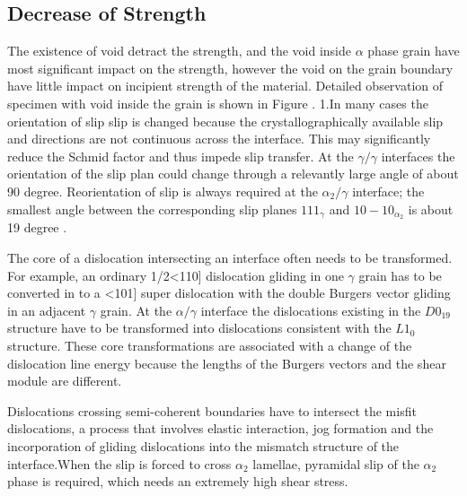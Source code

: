 \documentclass[final,5p,times,onecolumn]{elsarticle}
\begin{document}
\subsection{Decrease of Strength}

The existence of void detract the strength, and the void inside $\alpha$ phase grain have most significant  impact on the strength, however the void on the grain boundary have little impact on incipient strength of the material. Detailed observation of specimen with void inside the grain is shown in Figure \cite{}.
1.In many cases the orientation of slip slip is changed because the crystallographically available slip and directions are not continuous across the interface. This may significantly reduce the Schmid factor and thus impede slip transfer. At the $\gamma/\gamma$ interfaces the orientation of the slip plan could change through a relevantly large angle of about 90 degree. Reorientation of slip is always required at the $\alpha_{2}/\gamma$ interface; the smallest angle between the corresponding slip planes ${1 1 1 }_{\gamma}$ and ${ 1 0 -1 0}_{\alpha_2}$ is about 19 degree \cite{}.


The core of  a dislocation intersecting an interface often needs to be transformed. For example, an ordinary 1/2<110] dislocation gliding in one $\gamma$ grain has to be converted in to a <101] super dislocation with the double Burgers vector gliding in an adjacent $\gamma$ grain. At the $\alpha/\gamma$ interface the dislocations existing in the $D0_{19}$ structure have to be transformed into dislocations consistent with the $L1_0$structure. These core transformations are associated with a change of the dislocation line energy because the lengths of the Burgers vectors and the shear module are different.
 
Dislocations crossing semi-coherent boundaries have to intersect the misfit dislocations, a process that involves elastic interaction, jog formation and the incorporation of gliding dislocations into the mismatch structure of the interface.When the slip is forced to cross $\alpha_2$ lamellae, pyramidal slip of the $\alpha_2$ phase is required, which needs an extremely high shear stress.
\end{document}
